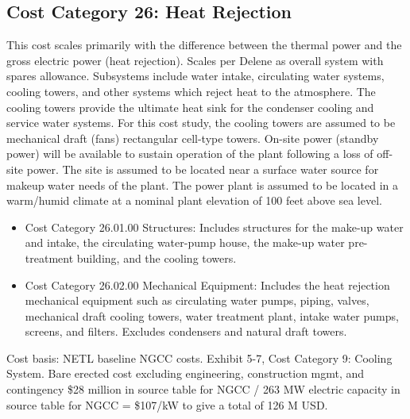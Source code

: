 \subsection{Cost Category 26: Heat Rejection} 

This cost scales primarily with the difference between the thermal power and the gross electric power (heat rejection). Scales per Delene as overall system with spares allowance.  Subsystems include water intake, circulating water systems, cooling towers, and other systems which reject heat to the atmosphere. The cooling towers provide the ultimate heat sink for the condenser cooling and service water systems.  For this cost study, the cooling towers are assumed to be mechanical draft (fans) rectangular cell-type towers.  On-site power (standby power) will be available to sustain operation of the plant following a loss of off-site power. The site is assumed to be located near a surface water source for makeup water needs of the plant.  The power plant is assumed to be located in a warm/humid climate at a nominal plant elevation of 100 feet above sea level.  

\begin{itemize}
    \item Cost Category 26.01.00 Structures: Includes structures for the make-up water and intake, the circulating water-pump house, the make-up water pre-treatment building, and the cooling towers.
    \item Cost Category 26.02.00 Mechanical Equipment: Includes the heat rejection mechanical equipment such as circulating water pumps, piping, valves, mechanical draft cooling towers, water treatment plant, intake water pumps, screens, and filters. Excludes condensers and natural draft towers.
\end{itemize}

Cost basis: NETL baseline NGCC costs. Exhibit 5-7, Cost Category 9: Cooling System. Bare erected cost excluding engineering, construction mgmt, and contingency \$28 million in source table for NGCC / 263 MW electric capacity in source table for NGCC = \$107/kW to give a total of 126 M USD.








